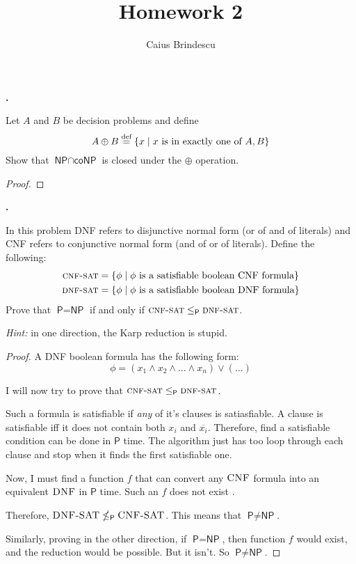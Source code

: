 \documentclass[letterpaper,11pt]{article}
\title{Homework 2}
\author{Caius Brindescu}
\newcommand{\cc}[1]{\ensuremath{\textsf{#1}}\xspace}
\renewcommand{\P}{\cc{P}}
\newcommand{\NP}{\cc{NP}}
\newcommand{\coNP}{\cc{coNP}}
\newcommand{\karp}{\le_{\textsf{P}}}
\newcommand{\notkarp}{\nleq_{\textsf{P}}}
\newcounter{problem}
\newenvironment{problem}%
{%
	\stepcounter{problem}%
	\textbf{\theproblem.}
	\large
}{\\}%
\begin{document}
\maketitle

\begin{problem}
%
Let $A$ and $B$ be decision problems and define
\[
    A \oplus B \overset{\scriptsize\textrm{def}}= 
    \{ x \mid x \mbox{ is in exactly one of } A, B \}
\]
Show that $\NP \cap \coNP$ is closed under the $\oplus$ operation.
\end{problem}

\begin{proof}
\end{proof}


\begin{problem}
In this problem DNF refers to disjunctive normal form ({\sc or} of {\sc and} of literals) and CNF refers to conjunctive normal form ({\sc and} of {\sc or} of literals). Define the following:
\begin{align*}
    \textsc{cnf-sat} &= \{ \phi \mid \phi \mbox{ is a satisfiable boolean CNF formula}\} \\
    \textsc{dnf-sat} &= \{ \phi \mid \phi \mbox{ is a satisfiable boolean DNF formula}\} 
\end{align*}
Prove that $\P = \NP$ if and only if $\textsc{cnf-sat} \karp \textsc{dnf-sat}$.

{\em Hint:} in one direction, the Karp reduction is stupid.
\end{problem}

\begin{proof}
A DNF boolean formula has the following form:
\[
\phi = ( x_{1} \wedge x_{2} \wedge \ldots \wedge x_{n} ) \vee ( \ldots )
\]

I will now try to prove that $\textsc{cnf-sat} \karp \textsc{dnf-sat}$.

Such a formula is satisfiable if \textit{any} of it's clauses is satiasfiable.
A clause is satisfiable iff it does not contain both $x_{i}$ and $\overline{x_{i}}$.
Therefore, find a satisfiable condition can be done in \P{} time.
The algorithm just has too loop through each clause and stop when it finds the first satisfiable one.

Now, I must find a function $f$ that can convert any $\textsc{CNF}$ formula into an equivalent $\textsc{DNF}$ in \P{} time. 
Such an $f$ does not exist \cite{dnf}.

Therefore, $\textsc{DNF-SAT} \notkarp \textsc{CNF-SAT}$.
This means that $\P \neq \NP$.

Similarly, proving in the other direction, if $\P = \NP$, then function $f$ would exist, and the reduction would be possible.
But it isn't.
So $\P \neq \NP$.

\end{proof}
\end{document}
